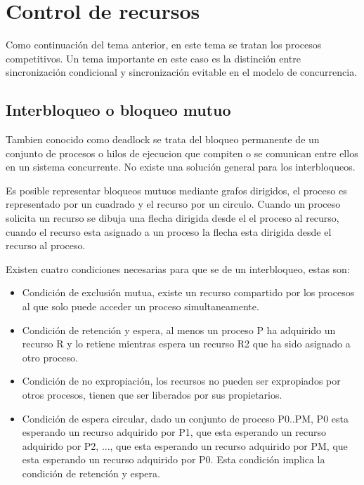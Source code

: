 \section{Control de recursos}

Como continuación del tema anterior, en este tema se tratan los procesos
competitivos. Un tema importante en este caso es la distinción entre
sincronización condicional y sincronización evitable en el modelo de
concurrencia.


\subsection{Interbloqueo o bloqueo mutuo}

Tambien conocido como deadlock se trata del bloqueo permanente de un conjunto de
procesos o hilos de ejecucion que compiten o se comunican entre ellos en un
sistema concurrente. No existe una solución general para los interbloqueos.

Es posible representar bloqueos mutuos mediante grafos dirigidos, el proceso es
representado por un cuadrado y el recurso por un circulo. Cuando un proceso
solicita un recurso se dibuja una flecha dirigida desde el el proceso al
recurso, cuando el recurso esta asignado a un proceso la flecha esta dirigida
desde el recurso al proceso.

Existen cuatro condiciones necesarias para que se de un interbloqueo, estas son:

\begin{itemize}
	\item Condición de exclusión mutua, existe un recurso compartido por los
procesos al que solo puede acceder un proceso simultaneamente.
	\item Condición de retención y espera, al menos un proceso P ha
adquirido un recurso R y lo retiene mientras espera un recurso R2 que ha sido
asignado a otro proceso.
	\item Condición de no expropiación, los recursos no pueden ser
expropiados por otros procesos, tienen que ser liberados por sus propietarios.
	\item Condición de espera circular, dado un conjunto de proceso P0..PM,
P0 esta esperando un recurso adquirido por P1, que esta esperando un recurso
adquirido por P2, ..., que esta esperando un recurso adquirido por PM, que esta
esperando un recurso adquirido por P0. Esta condición implica la condición de
retención y espera.
\end{itemize}

